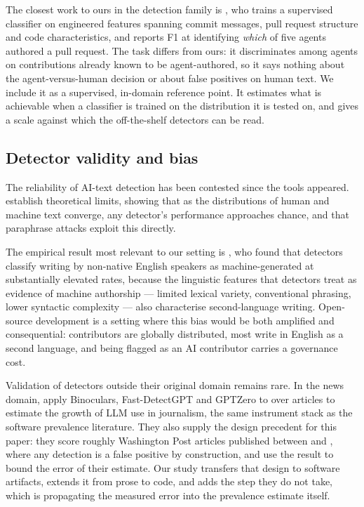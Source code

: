 The closest work to ours in the detection family is \citet{ghaleb2026fingerprinting},
who trains a supervised classifier on  engineered features spanning commit messages,
pull request structure and code characteristics, and reports  F1 at identifying
\emph{which} of five agents authored a pull request. The task differs from ours: it
discriminates among agents on contributions already known to be agent-authored, so it
says nothing about the agent-versus-human decision or about false positives on human
text. We include it as a supervised, in-domain reference point. It estimates what is
achievable when a classifier is trained on the distribution it is tested on, and gives a
scale against which the off-the-shelf detectors can be read.

\subsection{Detector validity and bias}
\label{sec:background:validity}

The reliability of AI-text detection has been contested since the tools appeared.
\citet{sadasivan2023reliably} establish theoretical limits, showing that as the
distributions of human and machine text converge, any detector's performance approaches
chance, and that paraphrase attacks exploit this directly.

The empirical result most relevant to our setting is \citet{liang2023biased}, who found
that detectors classify writing by non-native English speakers as machine-generated at
substantially elevated rates, because the linguistic features that detectors treat as
evidence of machine authorship --- limited lexical variety, conventional phrasing,
lower syntactic complexity --- also characterise second-language writing. Open-source
development is a setting where this bias would be both amplified and consequential:
contributors are globally distributed, most write in English as a second language, and
being flagged as an AI contributor carries a governance cost.

Validation of detectors outside their original domain remains rare. In the news domain,
\citet{ansari2025echoes} apply Binoculars, Fast-DetectGPT and GPTZero to over
 articles to estimate the growth of LLM use in journalism, the same
instrument stack as the software prevalence literature. They also supply the design
precedent for this paper: they score roughly  Washington Post articles
published between  and , where any detection is a false
positive by construction, and use the result to bound the error of their estimate. Our
study transfers that design to software artifacts, extends it from prose to code, and
adds the step they do not take, which is propagating the measured error into the
prevalence estimate itself.

